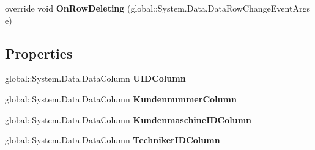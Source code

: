 \begin{DoxyCompactItemize}
\item 
override void {\bfseries On\+Row\+Deleting} (global\+::\+System.\+Data.\+Data\+Row\+Change\+Event\+Args e)\hypertarget{class_products_1_1_data_1_1ds_sage_1_1_servicetermin_data_table_ac4f6cd1e913f4622769da2cae9fab7a4}{}\label{class_products_1_1_data_1_1ds_sage_1_1_servicetermin_data_table_ac4f6cd1e913f4622769da2cae9fab7a4}

\end{DoxyCompactItemize}
\subsection*{Properties}
\begin{DoxyCompactItemize}
\item 
global\+::\+System.\+Data.\+Data\+Column {\bfseries U\+I\+D\+Column}\hypertarget{class_products_1_1_data_1_1ds_sage_1_1_servicetermin_data_table_ae13ef3beb59e3de6022c7b9ce199d0c6}{}\label{class_products_1_1_data_1_1ds_sage_1_1_servicetermin_data_table_ae13ef3beb59e3de6022c7b9ce199d0c6}

\item 
global\+::\+System.\+Data.\+Data\+Column {\bfseries Kundennummer\+Column}\hypertarget{class_products_1_1_data_1_1ds_sage_1_1_servicetermin_data_table_aebecd6154bb866c04183b62210cccc95}{}\label{class_products_1_1_data_1_1ds_sage_1_1_servicetermin_data_table_aebecd6154bb866c04183b62210cccc95}

\item 
global\+::\+System.\+Data.\+Data\+Column {\bfseries Kundenmaschine\+I\+D\+Column}\hypertarget{class_products_1_1_data_1_1ds_sage_1_1_servicetermin_data_table_a0425cd3545a44e48e3df4f8c81536c5b}{}\label{class_products_1_1_data_1_1ds_sage_1_1_servicetermin_data_table_a0425cd3545a44e48e3df4f8c81536c5b}

\item 
global\+::\+System.\+Data.\+Data\+Column {\bfseries Techniker\+I\+D\+Column}\hypertarget{class_products_1_1_data_1_1ds_sage_1_1_servicetermin_data_table_a118ffb01250606589c0734e0440d4894}{}\label{class_products_1_1_data_1_1ds_sage_1_1_servicetermin_data_table_a118ffb01250606589c0734e0440d4894}


\end{DoxyCompactItemize}
